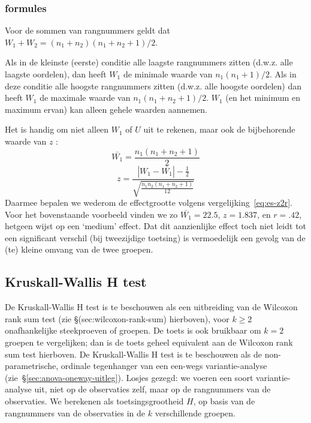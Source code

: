 \documentclass[
]{book}
\begin{document}
\hypertarget{formules-7}{%
\subsubsection{formules}\label{formules-7}}

Voor de sommen van rangnummers geldt dat
\(W_1 + W_2 = (n_1+n_2) (n_1+n_2+1) / 2\).

Als in de kleinste (eerste) conditie alle laagste rangnummers zitten
(d.w.z. alle laagste oordelen), dan heeft \(W_1\) de minimale waarde van
\(n_1 (n_1+1) /2\). Als in deze conditie alle hoogste rangnummers zitten
(d.w.z. alle hoogste oordelen) dan heeft \(W_1\) de maximale waarde van
\(n_1 (n_1+n_2+1) / 2\). \(W_1\) (en het minimum en maximum ervan) kan
alleen gehele waarden aannemen.

Het is handig om niet alleen \(W_1\) of \(U\) uit te rekenen, maar ook de
bijbehorende waarde van \(z\) \citep{Ferg89}:
\begin{equation}
  \label{eq:Wilcoxon-ranksum}
\bar{W_1} = \frac{ n_1 (n_1+n_2+1) }{ 2 }
\end{equation}
\begin{equation}
   \label{eq:Wilcoxon-ranksum-z}
  z = \frac{ |W_1-\bar{W_1}|-\frac{1}{2} }{ \sqrt{ \frac{n_1 n_2 (n_1+n_2+1)}{12} } }
\end{equation}
Daarmee bepalen we wederom de effectgrootte volgens
vergelijking~\eqref{eq:es-z2r}.
Voor het bovenstaande voorbeeld vinden we zo
\(\bar{W_1}=22.5\), \(z=1.837\), en \(r=.42\), hetgeen wijst op een `medium'
effect. Dat dit aanzienlijke effect toch niet leidt tot een significant
verschil (bij tweezijdige toetsing) is vermoedelijk een gevolg van de
(te) kleine omvang van de twee groepen.

\hypertarget{kruskall-wallis-h-test}{%
\subsection{Kruskall-Wallis H test}\label{kruskall-wallis-h-test}}

De Kruskall-Wallis H test is te beschouwen als een uitbreiding van de
Wilcoxon rank sum test (zie
§(sec:wilcoxon-rank-sum) hierboven), voor \(k \ge 2\) onafhankelijke
steekproeven of groepen. De toets is ook bruikbaar om \(k=2\) groepen te
vergelijken; dan is de toets geheel equivalent aan de Wilcoxon rank sum
test hierboven. De Kruskall-Wallis H test is te beschouwen als de
non-parametrische, ordinale tegenhanger van een een-wegs
variantie-analyse
(zie~§\ref{sec:anova-oneway-uitleg}). Losjes gezegd: we voeren een
soort variantie-analyse uit, niet op de observaties zelf, maar op de
rangnummers van de observaties. We berekenen als toetsingsgrootheid \(H\),
op basis van de rangnummers van de observaties in de \(k\) verschillende
groepen.
\end{document}

